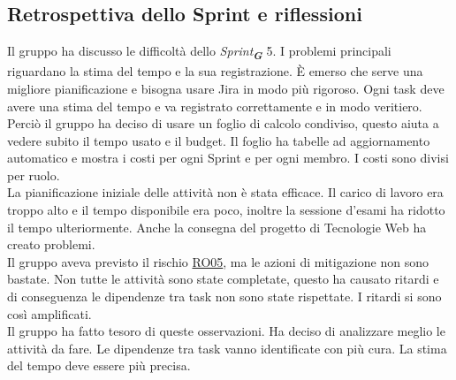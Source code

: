 \documentclass[a4paper,12pt]{article}
\newcommand{\glossario}[1]{\textit{#1}\textsubscript{\textbf{\textit{\textcolor{lightblack}{G}}}}}
\begin{document}
\subsection{Retrospettiva dello Sprint e riflessioni}
Il gruppo ha discusso le difficoltà dello \glossario{Sprint} 5. I problemi principali riguardano la stima del tempo e la sua registrazione. È emerso che serve una migliore pianificazione e bisogna usare Jira in modo più rigoroso. Ogni task deve avere una stima del tempo e va registrato correttamente e in modo veritiero.\\
Perciò il gruppo ha deciso di usare un foglio di calcolo condiviso, questo aiuta a vedere subito il tempo usato e il budget. Il foglio ha tabelle ad aggiornamento automatico e mostra i costi per ogni Sprint e per ogni membro. I costi sono divisi per ruolo.\\

La pianificazione iniziale delle attività non è stata efficace. Il carico di lavoro era troppo alto e il tempo disponibile era poco, inoltre la sessione d'esami ha ridotto il tempo ulteriormente. Anche la consegna del progetto di Tecnologie Web ha creato problemi.\\
Il gruppo aveva previsto il rischio \href{https://cdn.jsdelivr.net/gh/7-zpus/Docs@main/2_RTB/PianoDiProgetto.pdf}{RO05}, ma le azioni di mitigazione non sono bastate. Non tutte le attività sono state completate, questo ha causato ritardi e di conseguenza le dipendenze tra task non sono state rispettate. I ritardi si sono così amplificati.\\

Il gruppo ha fatto tesoro di queste osservazioni. Ha deciso di analizzare meglio le attività da fare. Le dipendenze tra task vanno identificate con più cura. La stima del tempo deve essere più precisa.\\ 
\end{document}
